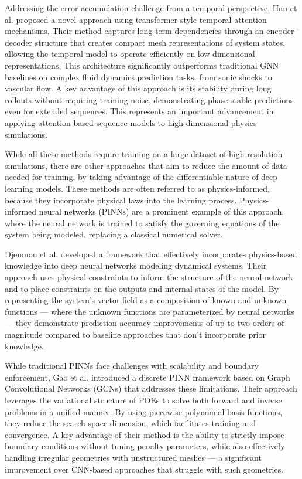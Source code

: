 Addressing the error accumulation challenge from a temporal perspective, Han et al. \cite{hanPredictingPhysicsMeshreduced2022a} proposed a novel approach using transformer-style temporal attention mechanisms. Their method captures long-term dependencies through an encoder-decoder structure that creates compact mesh representations of system states, allowing the temporal model to operate efficiently on low-dimensional representations. This architecture significantly outperforms traditional GNN baselines on complex fluid dynamics prediction tasks, from sonic shocks to vascular flow. A key advantage of this approach is its stability during long rollouts without requiring training noise, demonstrating phase-stable predictions even for extended sequences. This represents an important advancement in applying attention-based sequence models to high-dimensional physics simulations.

While all these methods require training on a large dataset of high-resolution simulations, there are other approaches that aim to reduce the amount of data needed for training, by taking advantage of the differentiable nature of deep learning models. These methods are often referred to as physics-informed, because they incorporate physical laws into the learning process. Physics-informed neural networks (PINNs) \cite{raissi2024physicsinformedneuralnetworksextensions} are a prominent example of this approach, where the neural network is trained to satisfy the governing equations of the system being modeled, replacing a classical numerical solver. 

Djeumou et al. \cite{djeumouNeuralNetworksPhysicsInformed2022} developed a framework that effectively incorporates physics-based knowledge into deep neural networks modeling dynamical systems. Their approach uses physical constraints to inform the structure of the neural network and to place constraints on the outputs and internal states of the model. By representing the system's vector field as a composition of known and unknown functions — where the unknown functions are parameterized by neural networks — they demonstrate prediction accuracy improvements of up to two orders of magnitude compared to baseline approaches that don't incorporate prior knowledge.

While traditional PINNs face challenges with scalability and boundary enforcement, Gao et al. \cite{gaoPhysicsinformedGraphNeural2022} introduced a discrete PINN framework based on Graph Convolutional Networks (GCNs) that addresses these limitations. Their approach leverages the variational structure of PDEs to solve both forward and inverse problems in a unified manner. By using piecewise polynomial basis functions, they reduce the search space dimension, which facilitates training and convergence. A key advantage of their method is the ability to strictly impose boundary conditions without tuning penalty parameters, while also effectively handling irregular geometries with unstructured meshes — a significant improvement over CNN-based approaches that struggle with such geometries.

